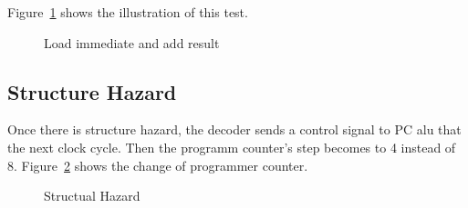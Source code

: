 \documentclass[preprint,authoryear,12pt]{elsarticle}
\begin{document}
Figure~\ref{fig:test_fig1} shows the illustration of this test.

\begin{figure}
\centering
{}
\caption{Load immediate and add result}
\label{fig:test_fig1}
\end{figure}


\subsection{Structure Hazard}

Once there is structure hazard, the decoder sends a control signal to
PC alu that the next clock cycle. Then the programm counter's step
becomes to 4 instead of 8. Figure~\ref{fig:test_fig2} shows the change
of programmer counter.

\begin{figure}
\centering
{}
\caption{Structual Hazard}
\label{fig:test_fig2}
\end{figure}




\end{document}
